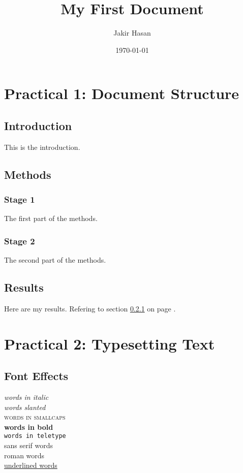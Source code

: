 \documentclass[a4paper, 12pt]{report}
\begin{document}
\title{My First Document}
\author{Jakir Hasan}
\date{\today}
\maketitle

\tableofcontents
\newpage
{}

\setcounter{chapter}{1}

\chapter*{Practical 1: Document Structure}

\section{Introduction}
This is the introduction.

\section{Methods}

\subsection{Stage 1}
\label{sec1}
The first part of the methods.

\subsection{Stage 2}
The second part of the methods.

\section{Results}
Here are my results. Refering to section \ref{sec1} on page \pageref{sec1}.


\setcounter{chapter}{2}
\chapter*{Practical 2: Typesetting Text}

\section{Font Effects}

\textit{words in italic}\\
\textsl{words slanted}\\
\textsc{words in smallcaps}\\
\textbf{words in bold}\\
\texttt{words in teletype}\\
\textsf{sans serif words}\\
\textrm{roman words}\\
\underline{underlined words}
\end{document}
